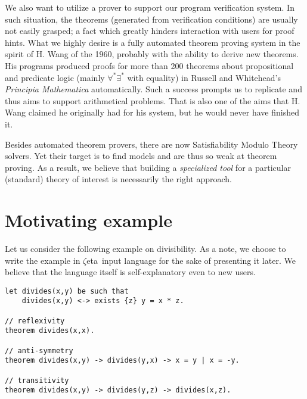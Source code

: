 \documentclass[12pt]{article}
\newcommand{\zetatp}{$\zeta$eta}
\begin{document}

We also want to utilize a prover to support our program verification system. In such situation, the theorems (generated from verification conditions) are usually not easily grasped; a fact which greatly hinders interaction with users for proof hints. What we highly desire is a fully automated theorem proving system in the spirit of H. Wang of the 1960, probably with the ability to derive new theorems. His programs produced  proofs for more than 200 theorems about propositional and predicate logic (mainly $\forall^{*}\exists^{*}$ with equality) in Russell and Whitehead's {\it Principia Mathematica} automatically. Such a success prompts us to replicate and thus aims to support arithmetical problems. That is also one of the aims that H. Wang claimed he originally had for his system, but he would never have finished it.

Besides automated theorem provers, there are now Satisfiability Modulo Theory solvers. Yet their target is to find models and are thus so weak at theorem proving. As a result, we believe that building a \emph{specialized tool} for a particular (standard) theory of interest is necessarily the right approach.

\section{Motivating example}

Let us consider the following example on divisibility. As a note, we choose to write the example in \zetatp\ input language for the sake of presenting it later. We believe that the language itself is self-explanatory even to new users.

\begin{lstlisting}
let divides(x,y) be such that
    divides(x,y) <-> exists {z} y = x * z.

// reflexivity
theorem divides(x,x).

// anti-symmetry
theorem divides(x,y) -> divides(y,x) -> x = y | x = -y.

// transitivity
theorem divides(x,y) -> divides(y,z) -> divides(x,z).
\end{lstlisting}
\end{document}
